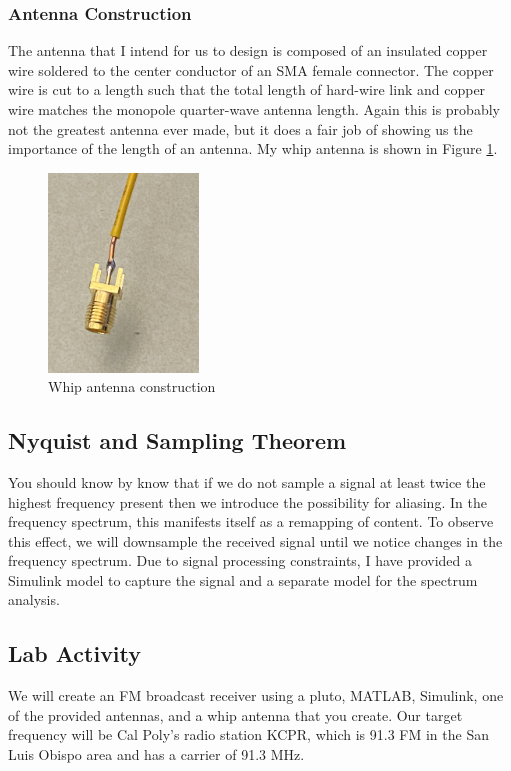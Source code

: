 \subsubsection{Antenna Construction}
The antenna that I intend for us to design is composed of an insulated copper wire soldered to the center conductor of an SMA female connector. The copper wire is cut to a length such that the total length of hard-wire link and copper wire matches the monopole quarter-wave antenna length. Again this is probably not the greatest antenna ever made, but it does a fair job of showing us the importance of the length of an antenna. My whip antenna is shown in Figure \ref{fig:whip}.

\begin{figure}
    \centering
    \includegraphics[scale=0.5, width=40mm]{images/whip.png}
    \caption{Whip antenna construction}
    \label{fig:whip}
\end{figure}

\subsection{Nyquist and Sampling Theorem}
You should know by know that if we do not sample a signal at least twice the highest frequency present then we introduce the possibility for aliasing. In the frequency spectrum, this manifests itself as a remapping of content. To observe this effect, we will downsample the received signal until we notice changes in the frequency spectrum. Due to signal processing constraints, I have provided a Simulink model to capture the signal and a separate model for the spectrum analysis.

\newpage
\subsection{Lab Activity}
We will create an FM broadcast receiver using a pluto, MATLAB, Simulink, one of the provided antennas, and a whip antenna that you create. Our target frequency will be Cal Poly's radio station KCPR, which is 91.3 FM in the San Luis Obispo area and has a carrier of 91.3 MHz.

